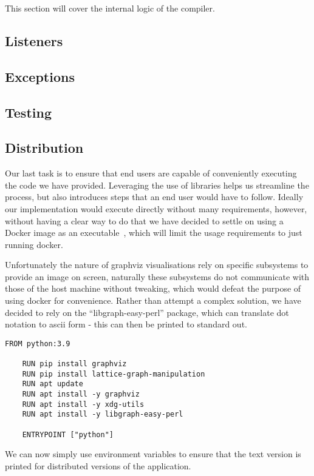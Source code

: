 This section will cover the internal logic of the compiler.

\subsection{Listeners}

\subsection{Exceptions}

\subsection{Testing}

\subsection{Distribution}
Our last task is to ensure that end users are capable of conveniently executing the code we have provided.
Leveraging the use of libraries helps us streamline the process, but also introduces steps that an end user would have
to follow.
Ideally our implementation would execute directly without many requirements, however, without having a clear way to do
that we have decided to settle on using a Docker image as an executable~\cite{DockerExec}, which will limit the usage
requirements to just running docker.

Unfortunately the nature of graphviz visualisations rely on specific subsystems to provide an image on screen, naturally
these subsystems do not communicate with those of the host machine without tweaking, which would defeat the purpose of
using docker for convenience.
Rather than attempt a complex solution, we have decided to rely on the ``libgraph-easy-perl'' package, which can
translate dot notation to ascii form - this can then be printed to standard out.

\begin{lstlisting}[caption={The DockerFile used for distribution},captionpos=b,label={lst:dockerfile}]
    FROM python:3.9

    RUN pip install graphviz
    RUN pip install lattice-graph-manipulation
    RUN apt update
    RUN apt install -y graphviz
    RUN apt install -y xdg-utils
    RUN apt install -y libgraph-easy-perl

    ENTRYPOINT ["python"]
\end{lstlisting}

We can now simply use environment variables to ensure that the text version is printed for distributed versions of
the application.
